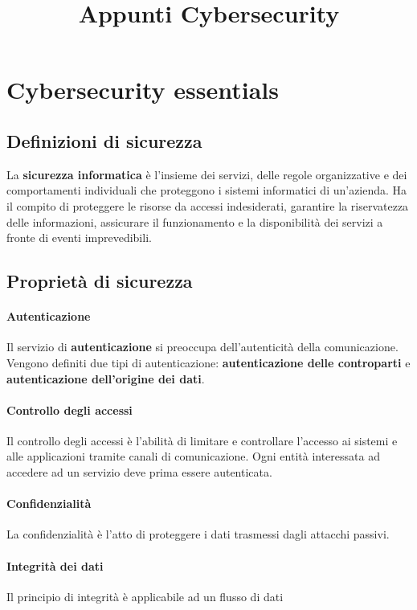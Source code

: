\documentclass[11pt]{article}
\title{Appunti Cybersecurity}
\begin{document}
\section{Cybersecurity essentials}
\subsection{Definizioni di sicurezza}
La \textbf{sicurezza informatica} è l'insieme dei servizi, delle regole organizzative e dei comportamenti individuali che proteggono 
i sistemi informatici di un'azienda. Ha il compito di proteggere le risorse da accessi indesiderati, garantire la riservatezza 
delle informazioni, assicurare il funzionamento e la disponibilità dei servizi a fronte di eventi imprevedibili.
\subsection{Proprietà di sicurezza}
\paragraph*{Autenticazione}
Il servizio di \textbf{autenticazione} si preoccupa dell'autenticità della comunicazione. Vengono definiti due tipi di 
autenticazione: \textbf{autenticazione delle controparti} e \textbf{autenticazione dell'origine dei dati}.
\paragraph*{Controllo degli accessi}
Il controllo degli accessi è l'abilità di limitare e controllare l'accesso ai sistemi e alle applicazioni tramite canali
di comunicazione. Ogni entità interessata ad accedere ad un servizio deve prima essere autenticata.
\paragraph*{Confidenzialità}
La confidenzialità è l'atto di proteggere i dati trasmessi dagli attacchi passivi. 
\paragraph*{Integrità dei dati}
Il principio di integrità è applicabile ad un flusso di dati
\end{document}
